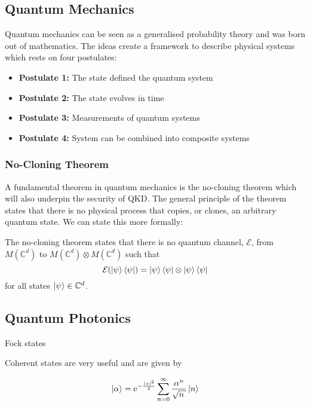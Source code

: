 \subsection{Quantum Mechanics}

Quantum mechanics can be seen as a generalised probability theory and was born out of mathematics. The ideas create a framework to describe physical systems which rests on four postulates:

\begin{itemize}
	\item[] \textbf{Postulate 1:} The state defined the quantum system
	\item[] \textbf{Postulate 2:} The state evolves in time
	\item[] \textbf{Postulate 3:} Measurements of quantum systems
	\item[] \textbf{Postulate 4:} System can be combined into composite systems
\end{itemize}

\subsubsection{No-Cloning Theorem}

A fundamental theorem in quantum mechanics is the {\color{bristol-red} no-cloning theorem} which will also underpin the security of \ac{QKD}. The general principle of the theorem states that there is no physical process that copies, or clones, an arbitrary quantum state. We can state this more formally:

\begin{theo}
	 The no-cloning theorem states that there is no quantum channel, $\mathcal{E}$, from $M(\mathbb{C}^d)$ to $M(\mathbb{C}^d) \otimes M(\mathbb{C}^d)$ such that
	 \begin{equation*}
	 	\mathcal{E}(\ket{\psi}\bra{\psi}) = \ket{\psi}\bra{\psi} \otimes \ket{\psi}\bra{\psi}
	 \end{equation*}
	 for all states $\ket{\psi} \in \mathbb{C}^d$.
\end{theo}


\subsection{Quantum Photonics}

Fock states

Coherent states are very useful and are given by

\begin{equation}
	\ket{\alpha} = \mathrm{e}^{-\frac{|\alpha|^2}{2}} \sum_{n=0}^\infty \frac{\alpha^n}{\sqrt{n}} \ket{n} 
\end{equation}

